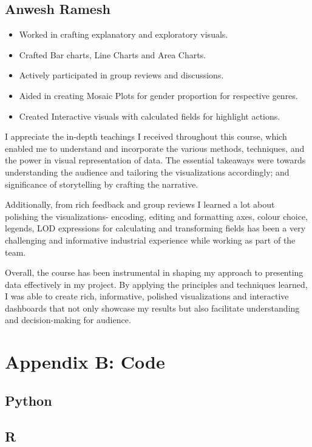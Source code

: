 \documentclass[12pt]{article}
\begin{document}
\newpage
\subsection{Anwesh Ramesh}
\begin{itemize}
    \item Worked in crafting explanatory and exploratory visuals.
    \item Crafted Bar charts, Line Charts and Area Charts.
    \item Actively participated in group reviews and discussions.
    \item Aided in  creating Mosaic Plots for gender proportion for respective genres. 
    \item Created Interactive visuals with calculated fields for highlight actions.
    \end{itemize}
I appreciate the in-depth teachings I received throughout this course, which enabled me to understand and incorporate the various methods, techniques, and the power in visual representation of data. The essential takeaways were towards understanding the audience and tailoring the visualizations accordingly; and significance of storytelling by crafting the narrative. 

Additionally, from rich feedback and group reviews I learned a lot about polishing the visualizations- encoding, editing and formatting axes, colour choice, legends, LOD expressions for calculating and transforming fields has been a very challenging and informative industrial experience while working as part of the team.

Overall, the course has been instrumental in shaping my approach to presenting data effectively in my project. By applying the principles and techniques learned, I was able to create rich, informative, polished visualizations and interactive dashboards that not only showcase my results but also facilitate understanding and decision-making for audience.



\section{Appendix B: Code}
\subsection{Python}

\subsection{R}

\end{document}

